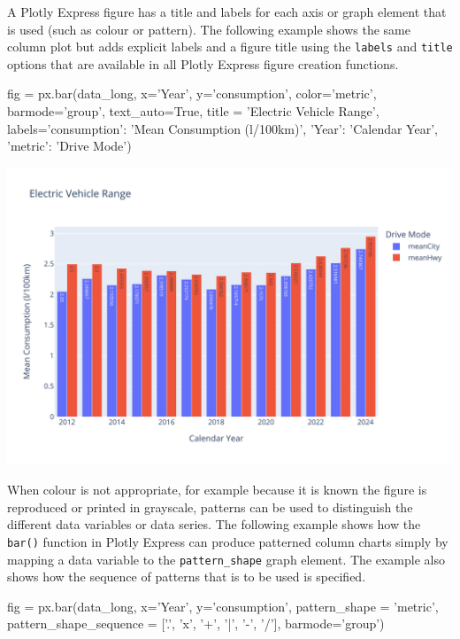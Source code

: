 A Plotly Express figure has a title and labels for each axis or graph element that is used (such as colour or pattern). The following example shows the same column plot but adds explicit labels and a figure title using the \texttt{labels} and \texttt{title} options that are available in all Plotly Express figure creation functions.

\begin{samepage}
\begin{pythoncode}
fig = px.bar(data_long,
  x='Year', y='consumption', color='metric', 
  barmode='group',
  text_auto=True,
  title = 'Electric Vehicle Range',
  labels={'consumption': 'Mean Consumption (l/100km)', 
          'Year': 'Calendar Year', 
          'metric': 'Drive Mode'})
\end{pythoncode}
\end{samepage}

\begin{center}
  \includegraphics[width=.8\textwidth]{px.fuel.columns.labels.pdf}
\end{center}

When colour is not appropriate, for example because it is known the figure is reproduced or printed in grayscale, patterns can be used to distinguish the different data variables or data series. The following example shows how the \texttt{bar()} function in Plotly Express can produce patterned column charts simply by mapping a data variable to the \texttt{pattern\_shape} graph element. The example also shows how the sequence of patterns that is to be used is specified.

\begin{samepage}
\begin{pythoncode}
fig = px.bar(data_long, 
   x='Year', y='consumption', pattern_shape = 'metric', 
   pattern_shape_sequence = ['.', 'x', '+', '|', '-', '/'],
   barmode='group')
\end{pythoncode}
\end{samepage}

